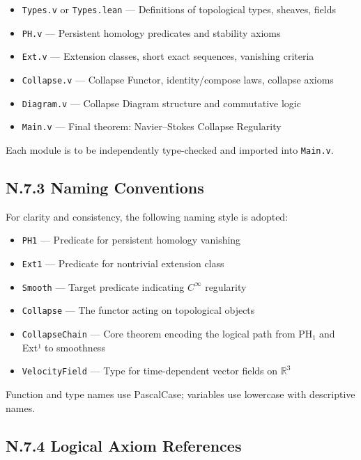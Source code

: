 \documentclass[11pt]{article}
\begin{document}
\begin{itemize}
  \item \texttt{Types.v} or \texttt{Types.lean} — Definitions of topological types, sheaves, fields
  \item \texttt{PH.v} — Persistent homology predicates and stability axioms
  \item \texttt{Ext.v} — Extension classes, short exact sequences, vanishing criteria
  \item \texttt{Collapse.v} — Collapse Functor, identity/compose laws, collapse axioms
  \item \texttt{Diagram.v} — Collapse Diagram structure and commutative logic
  \item \texttt{Main.v} — Final theorem: Navier–Stokes Collapse Regularity
\end{itemize}

Each module is to be independently type-checked and imported into \texttt{Main.v}.

\subsection*{N.7.3 Naming Conventions}

For clarity and consistency, the following naming style is adopted:

\begin{itemize}
  \item \texttt{PH1} — Predicate for persistent homology vanishing
  \item \texttt{Ext1} — Predicate for nontrivial extension class
  \item \texttt{Smooth} — Target predicate indicating $C^\infty$ regularity
  \item \texttt{Collapse} — The functor acting on topological objects
  \item \texttt{CollapseChain} — Core theorem encoding the logical path from PH₁ and Ext¹ to smoothness
  \item \texttt{VelocityField} — Type for time-dependent vector fields on $\mathbb{R}^3$
\end{itemize}

Function and type names use PascalCase; variables use lowercase with descriptive names.

\subsection*{N.7.4 Logical Axiom References}
\end{document}
